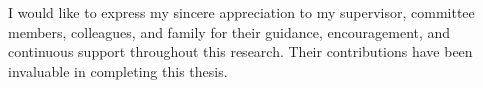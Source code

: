 \begin{acknowledgement}
I would like to express my sincere appreciation to my supervisor, committee
members, colleagues, and family for their guidance, encouragement, and
continuous support throughout this research. Their contributions have been
invaluable in completing this thesis.
\end{acknowledgement}

